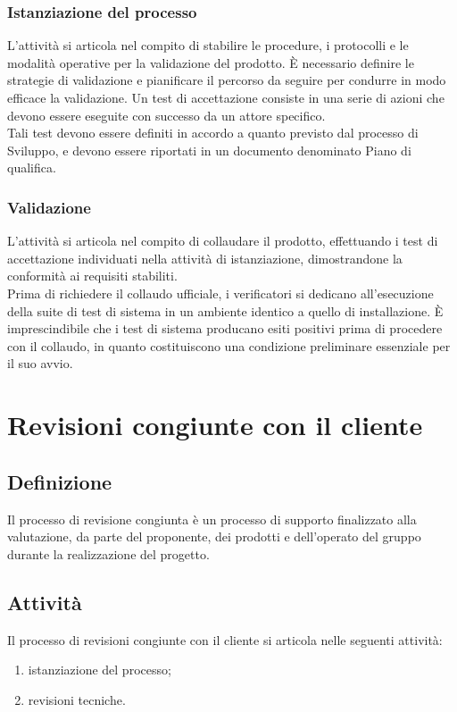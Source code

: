 \subsubsection{Istanziazione del processo}
 L'attività si articola nel compito di stabilire le procedure, i protocolli e le modalità operative per la validazione del prodotto. È necessario definire le strategie di validazione e pianificare il percorso da seguire per condurre in modo efficace la validazione. Un test di accettazione consiste in una serie di azioni che devono essere eseguite con successo da un attore specifico.\\
 Tali test devono essere definiti in accordo a quanto previsto dal processo di Sviluppo, e devono essere riportati in un documento denominato Piano di qualifica.
\subsubsection{Validazione}
L'attività si articola nel compito di collaudare il prodotto, effettuando i test di accettazione individuati nella attività di istanziazione, dimostrandone la conformità ai requisiti stabiliti.\\
Prima di richiedere il collaudo ufficiale, i verificatori si dedicano all'esecuzione della suite di test di sistema in un ambiente identico a quello di installazione. È imprescindibile che i test di sistema producano esiti positivi prima di procedere con il collaudo, in quanto costituiscono una condizione preliminare essenziale per il suo avvio.


\newpage

\section{Revisioni congiunte con il cliente} \label{sec:revisionicliente}
\subsection{Definizione}
Il processo di revisione congiunta è un processo di supporto finalizzato alla valutazione, da parte del proponente, dei prodotti e dell'operato del gruppo durante la realizzazione del progetto.
\subsection{Attività}
Il processo di revisioni congiunte con il cliente si articola nelle seguenti attività:
\begin{enumerate}
    \item istanziazione del processo;
    \item revisioni tecniche.
\end{enumerate}
